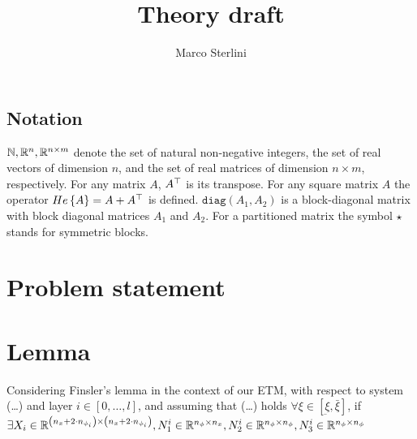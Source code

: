 \documentclass{article}
\begin{document}
\date{}
\author{Marco Sterlini}

\title{Theory draft}
\maketitle

\subsection*{\textbf{Notation}}
${\mathbb{N}}, {\mathbb{R}}^{n}, {\mathbb{R}}^{n \times m}$ denote the set of natural non-negative integers, the set of real vectors of dimension $n$, and the set of real matrices of dimension $n \times m$, respectively. For any matrix $A$, $A^\top$ is its transpose. For any square matrix $A$ the operator $He\left\{ A \right\} = A + A^\top$ is defined. $\texttt{diag}(A_1, A_2)$ is a block-diagonal matrix with block diagonal matrices $A_1$ and $A_2$. For a partitioned matrix the symbol $\star$ stands for symmetric blocks.

\section*{Problem statement}


\section*{\textbf{Lemma}}
Considering Finsler's lemma in the context of our ETM, with respect to system (\dots) and layer $i \in \left[ 0, \dots, l \right]$, and assuming that (\dots) holds $\forall \xi \in \left[ \underbar{\xi},  \bar{\xi} \right]$, if $\exists X_i \in {\mathbb{R}}^{\left( n_x + 2 \cdot n_{\phi_i} \right) \times\left( n_x + 2 \cdot n_{\phi_i} \right)}, N_{1}^{i} \in {\mathbb{R}}^{n_{\phi} \times n_x}, N_2^i \in {\mathbb{R}}^{n_{\phi} \times n_{\phi}}, N_3^i \in {\mathbb{R}}^{n_{\phi} \times n_{\phi}}$
\end{document}

